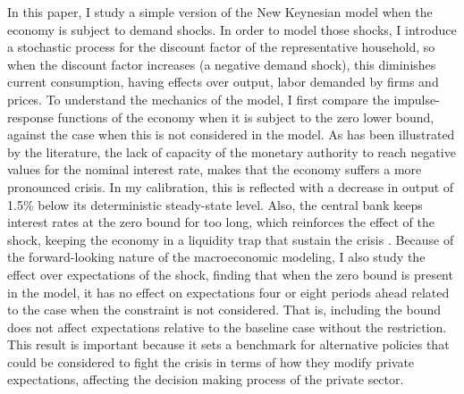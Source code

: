 \documentclass[12pt]{article}
\numberwithin{equation}{section}
\begin{document}
In this paper, I study a simple version of the New Keynesian model when the economy is subject to demand shocks. In order to model those shocks, I introduce a stochastic process for the discount factor of the representative household, so when the discount factor increases (a negative demand shock), this diminishes current consumption, having effects over output, labor demanded by firms and prices. To understand the mechanics of the model, I first compare the impulse-response functions of the economy when it is subject to the zero lower bound, against the case when this is not considered in the model. As has been illustrated by the literature, the lack of capacity of the monetary authority to reach negative values for the nominal interest rate, makes that the economy suffers a more pronounced crisis. In my calibration, this is reflected with a decrease in output of 1.5\% below its deterministic steady-state level. Also, the central bank keeps interest rates at the zero bound for too long, which reinforces the effect of the shock, keeping the economy in a liquidity trap that sustain the crisis \citep{Werning2012}. Because of the forward-looking nature of the macroeconomic modeling, I also study the effect over expectations of the shock, finding that when the zero bound is present in the model, it has no effect on expectations four or eight periods ahead related to the case when the constraint is not considered. That is, including the bound does not affect expectations relative to the baseline case without the restriction. This result is important because it sets a benchmark for alternative policies that could be considered to fight the crisis in terms of how they modify private expectations, affecting the decision making process of the private sector.
\end{document}
